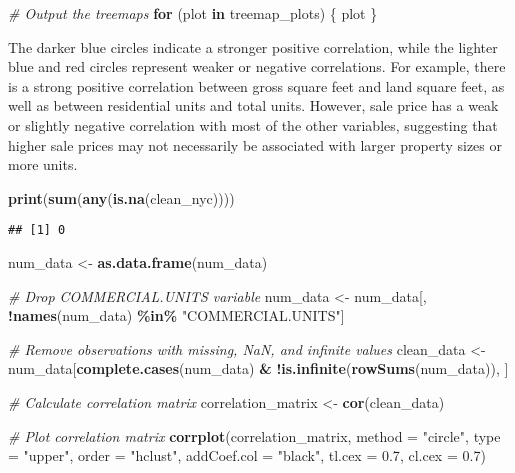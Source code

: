 \documentclass[
]{article}
\newenvironment{Shaded}{\begin{snugshade}}{\end{snugshade}}
\newcommand{\AttributeTok}[1]{\textcolor[rgb]{0.13,0.29,0.53}{#1}}
\newcommand{\CommentTok}[1]{\textcolor[rgb]{0.56,0.35,0.01}{\textit{#1}}}
\newcommand{\ControlFlowTok}[1]{\textcolor[rgb]{0.13,0.29,0.53}{\textbf{#1}}}
\newcommand{\FloatTok}[1]{\textcolor[rgb]{0.00,0.00,0.81}{#1}}
\newcommand{\FunctionTok}[1]{\textcolor[rgb]{0.13,0.29,0.53}{\textbf{#1}}}
\newcommand{\NormalTok}[1]{#1}
\newcommand{\OtherTok}[1]{\textcolor[rgb]{0.56,0.35,0.01}{#1}}
\newcommand{\SpecialCharTok}[1]{\textcolor[rgb]{0.81,0.36,0.00}{\textbf{#1}}}
\newcommand{\StringTok}[1]{\textcolor[rgb]{0.31,0.60,0.02}{#1}}
\begin{document}
\begin{Shaded}
\begin{Highlighting}[]
\CommentTok{\# Output the treemaps}
\ControlFlowTok{for}\NormalTok{ (plot }\ControlFlowTok{in}\NormalTok{ treemap\_plots) \{}
\NormalTok{  plot}
\NormalTok{\}}
\end{Highlighting}
\end{Shaded}

The darker blue circles indicate a stronger positive correlation, while
the lighter blue and red circles represent weaker or negative
correlations. For example, there is a strong positive correlation
between gross square feet and land square feet, as well as between
residential units and total units. However, sale price has a weak or
slightly negative correlation with most of the other variables,
suggesting that higher sale prices may not necessarily be associated
with larger property sizes or more units.

\begin{Shaded}
\begin{Highlighting}[]
\FunctionTok{print}\NormalTok{(}\FunctionTok{sum}\NormalTok{(}\FunctionTok{any}\NormalTok{(}\FunctionTok{is.na}\NormalTok{(clean\_nyc))))}
\end{Highlighting}
\end{Shaded}

\begin{verbatim}
## [1] 0
\end{verbatim}

\begin{Shaded}
\begin{Highlighting}[]
\NormalTok{num\_data }\OtherTok{\textless{}{-}} \FunctionTok{as.data.frame}\NormalTok{(num\_data)}

\CommentTok{\# Drop COMMERCIAL.UNITS variable}
\NormalTok{num\_data }\OtherTok{\textless{}{-}}\NormalTok{ num\_data[, }\SpecialCharTok{!}\FunctionTok{names}\NormalTok{(num\_data) }\SpecialCharTok{\%in\%} \StringTok{"COMMERCIAL.UNITS"}\NormalTok{]}


\CommentTok{\# Remove observations with missing, NaN, and infinite values}
\NormalTok{clean\_data }\OtherTok{\textless{}{-}}\NormalTok{ num\_data[}\FunctionTok{complete.cases}\NormalTok{(num\_data) }\SpecialCharTok{\&} \SpecialCharTok{!}\FunctionTok{is.infinite}\NormalTok{(}\FunctionTok{rowSums}\NormalTok{(num\_data)), ]}

\CommentTok{\# Calculate correlation matrix}
\NormalTok{correlation\_matrix }\OtherTok{\textless{}{-}} \FunctionTok{cor}\NormalTok{(clean\_data)}

\CommentTok{\# Plot correlation matrix}
\FunctionTok{corrplot}\NormalTok{(correlation\_matrix, }\AttributeTok{method =} \StringTok{"circle"}\NormalTok{, }\AttributeTok{type =} \StringTok{"upper"}\NormalTok{, }\AttributeTok{order =} \StringTok{"hclust"}\NormalTok{,}
         \AttributeTok{addCoef.col =} \StringTok{"black"}\NormalTok{, }\AttributeTok{tl.cex =} \FloatTok{0.7}\NormalTok{, }\AttributeTok{cl.cex =} \FloatTok{0.7}\NormalTok{)}
\end{Highlighting}
\end{Shaded}
\end{document}

